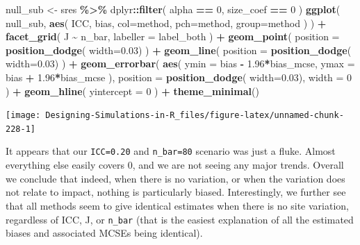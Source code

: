 \documentclass[
]{book}
\newenvironment{Shaded}{\begin{snugshade}}{\end{snugshade}}
\newcommand{\AttributeTok}[1]{\textcolor[rgb]{0.13,0.29,0.53}{#1}}
\newcommand{\DecValTok}[1]{\textcolor[rgb]{0.00,0.00,0.81}{#1}}
\newcommand{\FloatTok}[1]{\textcolor[rgb]{0.00,0.00,0.81}{#1}}
\newcommand{\FunctionTok}[1]{\textcolor[rgb]{0.13,0.29,0.53}{\textbf{#1}}}
\newcommand{\NormalTok}[1]{#1}
\newcommand{\OtherTok}[1]{\textcolor[rgb]{0.56,0.35,0.01}{#1}}
\newcommand{\SpecialCharTok}[1]{\textcolor[rgb]{0.81,0.36,0.00}{\textbf{#1}}}
\begin{document}
\begin{Shaded}
\begin{Highlighting}[]
\NormalTok{null\_sub }\OtherTok{\textless{}{-}}\NormalTok{ sres }\SpecialCharTok{\%\textgreater{}\%}
\NormalTok{  dplyr}\SpecialCharTok{::}\FunctionTok{filter}\NormalTok{( alpha }\SpecialCharTok{==} \DecValTok{0}\NormalTok{, size\_coef }\SpecialCharTok{==} \DecValTok{0}\NormalTok{ )}
\FunctionTok{ggplot}\NormalTok{( null\_sub, }\FunctionTok{aes}\NormalTok{( ICC, bias, }
                       \AttributeTok{col=}\NormalTok{method, }\AttributeTok{pch=}\NormalTok{method, }\AttributeTok{group=}\NormalTok{method ) ) }\SpecialCharTok{+}
  \FunctionTok{facet\_grid}\NormalTok{( J }\SpecialCharTok{\textasciitilde{}}\NormalTok{ n\_bar, }\AttributeTok{labeller =}\NormalTok{ label\_both ) }\SpecialCharTok{+}
  \FunctionTok{geom\_point}\NormalTok{( }\AttributeTok{position =} \FunctionTok{position\_dodge}\NormalTok{( }\AttributeTok{width=}\FloatTok{0.03}\NormalTok{) ) }\SpecialCharTok{+}
  \FunctionTok{geom\_line}\NormalTok{( }\AttributeTok{position =} \FunctionTok{position\_dodge}\NormalTok{( }\AttributeTok{width=}\FloatTok{0.03}\NormalTok{) ) }\SpecialCharTok{+}
  \FunctionTok{geom\_errorbar}\NormalTok{( }\FunctionTok{aes}\NormalTok{( }\AttributeTok{ymin =}\NormalTok{ bias }\SpecialCharTok{{-}} \FloatTok{1.96}\SpecialCharTok{*}\NormalTok{bias\_mcse,}
                      \AttributeTok{ymax =}\NormalTok{ bias }\SpecialCharTok{+} \FloatTok{1.96}\SpecialCharTok{*}\NormalTok{bias\_mcse ),}
                 \AttributeTok{position =} \FunctionTok{position\_dodge}\NormalTok{( }\AttributeTok{width=}\FloatTok{0.03}\NormalTok{),}
                 \AttributeTok{width =} \DecValTok{0}\NormalTok{ ) }\SpecialCharTok{+}
  \FunctionTok{geom\_hline}\NormalTok{( }\AttributeTok{yintercept =} \DecValTok{0}\NormalTok{ ) }\SpecialCharTok{+}
  \FunctionTok{theme\_minimal}\NormalTok{() }
\end{Highlighting}
\end{Shaded}

\begin{center}\texttt{[image: Designing-Simulations-in-R\_files/figure-latex/unnamed-chunk-228-1]} \end{center}

It appears that our \texttt{ICC=0.20} and \texttt{n\_bar=80} scenario was just a fluke.
Almost everything else easily covers 0, and we are not seeing any major trends.
Overall we conclude that indeed, when there is no variation, or when the variation does not relate to impact, nothing is particularly biased.
Interestingly, we further see that all methods seem to give identical estimates when there is no site variation, regardless of ICC, J, or \texttt{n\_bar} (that is the easiest explanation of all the estimated biases and associated MCSEs being identical).
\end{document}
